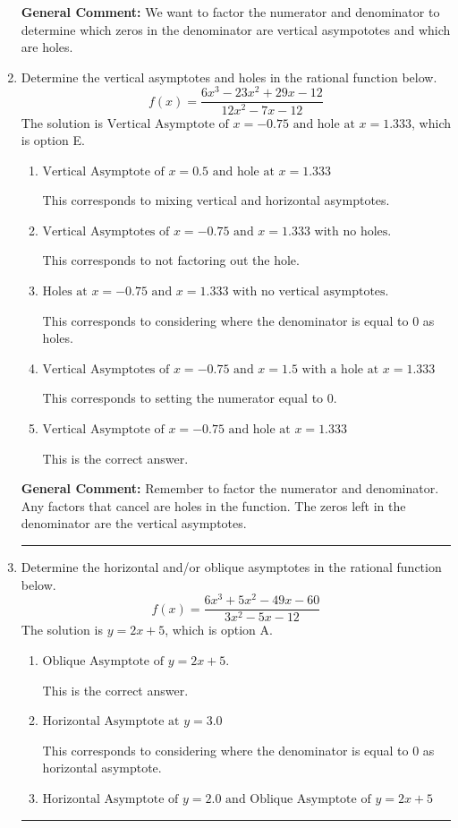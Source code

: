 \documentclass{extbook}[14pt]
\newcommand{\litem}[1]{\item #1

\rule{\textwidth}{0.4pt}}
\begin{document}
\begin{enumerate}
{\textbf{General Comment:} We want to factor the numerator and denominator to determine which zeros in the denominator are vertical asympototes and which are holes.
}
\litem{
Determine the vertical asymptotes and holes in the rational function below.
\[ f(x) = \frac{6x^{3} -23 x^{2} +29 x -12}{12x^{2} -7 x -12} \]The solution is \( \text{Vertical Asymptote of } x = -0.75 \text{ and hole at } x = 1.333 \), which is option E.\begin{enumerate}[label=\Alph*.]
\item \( \text{Vertical Asymptote of } x = 0.5 \text{ and hole at } x = 1.333 \)

This corresponds to mixing vertical and horizontal asymptotes.
\item \( \text{Vertical Asymptotes of } x = -0.75 \text{ and } x = 1.333 \text{ with no holes.} \)

This corresponds to not factoring out the hole.
\item \( \text{Holes at } x = -0.75 \text{ and } x = 1.333 \text{ with no vertical asymptotes.} \)

This corresponds to considering where the denominator is equal to 0 as holes.
\item \( \text{Vertical Asymptotes of } x = -0.75 \text{ and } x = 1.5 \text{ with a hole at } x = 1.333 \)

This corresponds to setting the numerator equal to 0.
\item \( \text{Vertical Asymptote of } x = -0.75 \text{ and hole at } x = 1.333 \)

This is the correct answer.
\end{enumerate}

\textbf{General Comment:} Remember to factor the numerator and denominator. Any factors that cancel are holes in the function. The zeros left in the denominator are the vertical asymptotes.
}
\litem{
Determine the horizontal and/or oblique asymptotes in the rational function below.
\[ f(x) = \frac{6x^{3} +5 x^{2} -49 x -60}{3x^{2} -5 x -12} \]The solution is \( y = 2x + 5 \), which is option A.\begin{enumerate}[label=\Alph*.]
\item \( \text{Oblique Asymptote of } y = 2x + 5. \)

This is the correct answer.
\item \( \text{Horizontal Asymptote at } y = 3.0 \)

This corresponds to considering where the denominator is equal to 0 as horizontal asymptote.
\item \( \text{Horizontal Asymptote of } y = 2.0 \text{ and Oblique Asymptote of } y = 2x + 5 \)


\end{enumerate}}
\end{enumerate}
\end{document}
